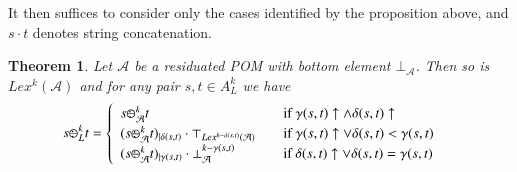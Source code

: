 \documentclass[a4paper]{elsarticle}
\newtheorem{theorem}{Theorem}
\newcommand{\1}{\mathbf{1}}
\def\odiv{{ \ominus\hspace{-8pt}:}\;}
\begin{document}
It then suffices to consider only the cases identified by the proposition above, and
$s \cdot t$ denotes string concatenation.

\begin{theorem}\label{prop:lexiRes}
	Let $\mathcal{A}$ be a residuated POM with bottom
	element $\bot_\mathcal{A}$.
	Then so is $Lex^k(\mathcal{A})$ and for any pair
	$s , t \in A^k_L$ we have
	\[
	s \odiv^k_L t = 	\begin{cases}
	\begin{array}{lcl}
	s \odiv^k_\mathcal{A} t & & \mbox{if  } \gamma(s,t) \uparrow \wedge \delta(s,t) \uparrow \\
	(s \odiv^k_\mathcal{A} t)_{\mid \delta(s,t)} \cdot \top_{Lex^{k-\delta(s,t)}(\mathcal{A})} & &  \mbox{if  } \gamma(s,t) \uparrow \vee \delta(s,t) < \gamma(s,t) \\
	(s \odiv^k_\mathcal{A} t)_{\mid \gamma(s,t)} \cdot \bot^{k - \gamma(s, t)}_\mathcal{A} & & \mbox{if  } \delta(s,t)  \uparrow \vee \delta(s,t) = \gamma(s,t)
	\end{array}
	\end{cases}
	\]
\end{theorem}
\end{document}
